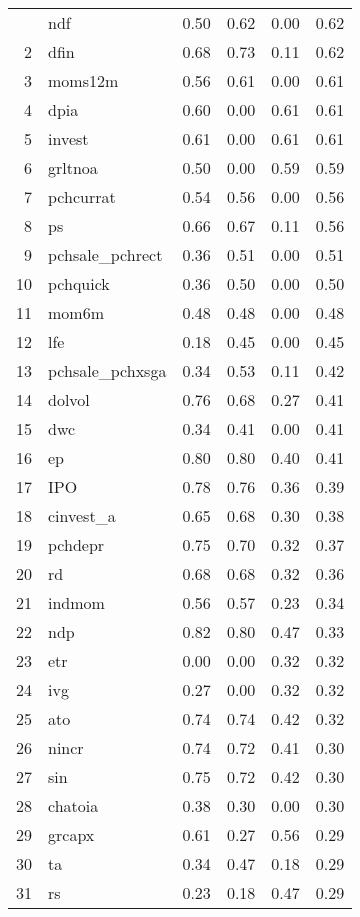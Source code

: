 \documentclass[12pt]{article}
\begin{document}
\begin{footnotesize}
\begin{longtable}{rl|c|c|c|c}
		\hline\hline
		\endfoot
1 & ndf & 0.50 & 0.62 & 0.00 & 0.62 \\ 
  2 & dfin & 0.68 & 0.73 & 0.11 & 0.62 \\ 
  3 & moms12m & 0.56 & 0.61 & 0.00 & 0.61 \\ 
  4 & dpia & 0.60 & 0.00 & 0.61 & 0.61 \\ 
  5 & invest & 0.61 & 0.00 & 0.61 & 0.61 \\ 
  6 & grltnoa & 0.50 & 0.00 & 0.59 & 0.59 \\ 
  7 & pchcurrat & 0.54 & 0.56 & 0.00 & 0.56 \\ 
  8 & ps & 0.66 & 0.67 & 0.11 & 0.56 \\ 
  9 & pchsale\_pchrect & 0.36 & 0.51 & 0.00 & 0.51 \\ 
  10 & pchquick & 0.36 & 0.50 & 0.00 & 0.50 \\ 
  11 & mom6m & 0.48 & 0.48 & 0.00 & 0.48 \\ 
  12 & lfe & 0.18 & 0.45 & 0.00 & 0.45 \\ 
  13 & pchsale\_pchxsga & 0.34 & 0.53 & 0.11 & 0.42 \\ 
  14 & dolvol & 0.76 & 0.68 & 0.27 & 0.41 \\ 
  15 & dwc & 0.34 & 0.41 & 0.00 & 0.41 \\ 
  16 & ep & 0.80 & 0.80 & 0.40 & 0.41 \\ 
  17 & IPO & 0.78 & 0.76 & 0.36 & 0.39 \\ 
  18 & cinvest\_a & 0.65 & 0.68 & 0.30 & 0.38 \\ 
  19 & pchdepr & 0.75 & 0.70 & 0.32 & 0.37 \\ 
  20 & rd & 0.68 & 0.68 & 0.32 & 0.36 \\ 
  21 & indmom & 0.56 & 0.57 & 0.23 & 0.34 \\ 
  22 & ndp & 0.82 & 0.80 & 0.47 & 0.33 \\ 
  23 & etr & 0.00 & 0.00 & 0.32 & 0.32 \\ 
  24 & ivg & 0.27 & 0.00 & 0.32 & 0.32 \\ 
  25 & ato & 0.74 & 0.74 & 0.42 & 0.32 \\ 
  26 & nincr & 0.74 & 0.72 & 0.41 & 0.30 \\ 
  27 & sin & 0.75 & 0.72 & 0.42 & 0.30 \\ 
  28 & chatoia & 0.38 & 0.30 & 0.00 & 0.30 \\ 
  29 & grcapx & 0.61 & 0.27 & 0.56 & 0.29 \\ 
  30 & ta & 0.34 & 0.47 & 0.18 & 0.29 \\ 
  31 & rs & 0.23 & 0.18 & 0.47 & 0.29 \\ 

\end{longtable}
\end{footnotesize}
\end{document}

